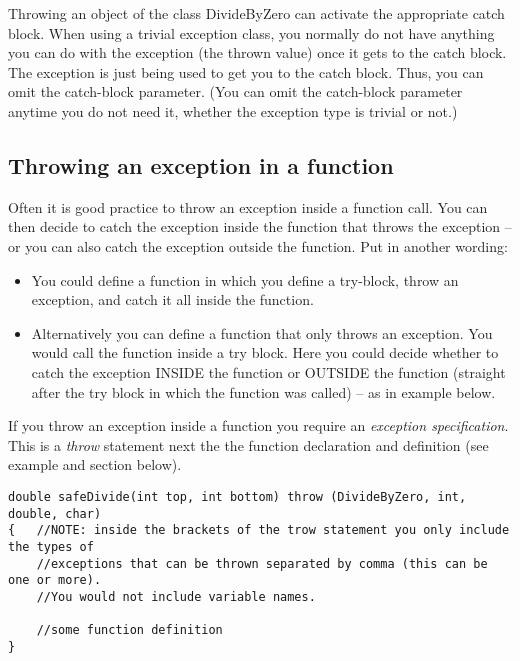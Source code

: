 Throwing an object of the class DivideByZero can activate the appropriate catch block. When
using a trivial exception class, you normally do not have anything you can do with the exception
(the thrown value) once it gets to the catch block. The exception is just being used to get you to the
catch block. Thus, you can omit the catch-block parameter. (You can omit the catch-block parameter
anytime you do not need it, whether the exception type is trivial or not.)





\subsection{Throwing an exception in a function}
Often it is good practice to throw an exception inside a function call. You can then decide to
catch the exception inside the function that throws the exception -- or you can also catch the
exception outside the function. Put in another wording:

\begin{itemize}
	\item You could define a function in which you define a try-block, throw an
	exception, and catch it all inside the function.
	\item Alternatively you can define a function that only throws an exception.
	You would call the function inside a try block. Here you could decide whether to catch
	the exception INSIDE the function or OUTSIDE the function (straight after the try block
	in which the function was called) -- as in example below.
\end{itemize}

If you throw an exception inside a function you require an \emph{exception specification}. This is
a \emph{throw} statement next the the function declaration and definition (see example and section
below).
\begin{verbatim}
double safeDivide(int top, int bottom) throw (DivideByZero, int, double, char)
{	//NOTE: inside the brackets of the trow statement you only include the types of
	//exceptions that can be thrown separated by comma (this can be one or more).
	//You would not include variable names.

	//some function definition
}
\end{verbatim}



